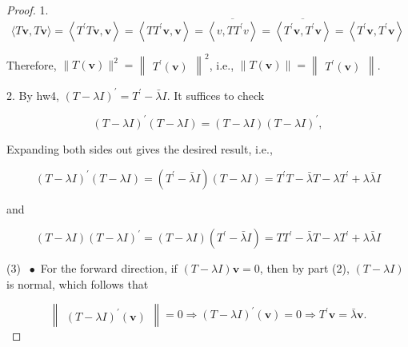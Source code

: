 \documentclass[11pt]{article}
\begin{document}
\begin{proof} 1.
\[
\langle T\mathbf{v},T\mathbf{v}\rangle  = \left\langle  {{T}^{\prime }T\mathbf{v},\mathbf{v}}\right\rangle
= \left\langle  {T{T}^{\prime }\mathbf{v},\mathbf{v}}\right\rangle
= \overline{\left\langle  v,T{T}^{\prime }v\right\rangle  }
= \overline{\left\langle  {T}^{\prime }\mathbf{v},{T}^{\prime }\mathbf{v}\right\rangle  }
= \left\langle  {{T}^{\prime }\mathbf{v},{T}^{\prime }\mathbf{v}}\right\rangle
\]

Therefore, \(\parallel T\left( \mathbf{v}\right) {\parallel }^2 = {\begin{Vmatrix}{T}^{\prime }\left( \mathbf{v}\right) \end{Vmatrix}}^2\), i.e., \(\parallel T\left( \mathbf{v}\right) \parallel  = \begin{Vmatrix}{{T}^{\prime }\left( \mathbf{v}\right) }\end{Vmatrix}\).

2. By hw4, \({\left( T - \lambda I\right) }^{\prime } = {T}^{\prime } - \bar{\lambda }I\). It suffices to check

\[
{\left( T - \lambda I\right) }^{\prime }\left( {T - {\lambda I}}\right)  = \left( {T - {\lambda I}}\right) {\left( T - \lambda I\right) }^{\prime },
\]

Expanding both sides out gives the desired result, i.e.,

\[
{\left( T - \lambda I\right) }^{\prime }\left( {T - {\lambda I}}\right)  = \left( {{T}^{\prime } - \bar{\lambda }I}\right) \left( {T - {\lambda I}}\right)  = {T}^{\prime }T - \bar{\lambda }T - \lambda {T}^{\prime } + \lambda \bar{\lambda }I
\]

and

\[
\left( {T - {\lambda I}}\right) {\left( T - \lambda I\right) }^{\prime } = \left( {T - {\lambda I}}\right) \left( {{T}^{\prime } - \bar{\lambda }I}\right)  = T{T}^{\prime } - \bar{\lambda }T - \lambda {T}^{\prime } + \lambda \bar{\lambda }I
\]

(3) \(\; \bullet\) For the forward direction, if \(\left( {T - {\lambda I}}\right) \mathbf{v} = 0\), then by part (2), \(\left( {T - {\lambda I}}\right)\) is normal, which follows that

\[
\begin{Vmatrix}{{\left( T - \lambda I\right) }^{\prime }\left( \mathbf{v}\right) }\end{Vmatrix} = 0 \Rightarrow  {\left( T - \lambda I\right) }^{\prime }\left( \mathbf{v}\right)  = 0 \Rightarrow  {T}^{\prime }\mathbf{v} = \bar{\lambda }\mathbf{v}.
\]


\end{proof}
\end{document}

